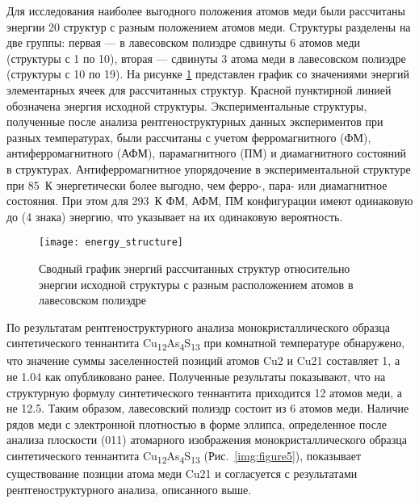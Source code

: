 Для исследования наиболее выгодного положения атомов меди были рассчитаны энергии 20 структур с разным положением атомов меди.
Структуры разделены на две группы: первая --- в лавесовском полиэдре сдвинуты 6 атомов меди (структуры с 1 по 10), вторая --- сдвинуты 3 атома меди в лавесовском полиэдре (структуры с 10 по 19).
На рисунке \ref{img:th} представлен график со значениями энергий элементарных ячеек для рассчитанных структур. Красной пунктирной линией обозначена энергия исходной структуры.
Экспериментальные структуры, полученные после анализа рентгеноструктурных данных  экспериментов при разных температурах, были рассчитаны с учетом ферромагнитного (ФМ), антиферромагнитного (АФМ), парамагнитного (ПМ) и диамагнитного состояний в структурах. 
Антиферромагнитное упорядочение в экспериментальной структуре при 85~К энергетически более выгодно, чем ферро-, пара- или диамагнитное состояния. При этом для 293~К ФМ, АФМ, ПМ конфигурации имеют одинаковую до (4 знака) энергию, что указывает на их одинаковую вероятность.

\begin{figure}[ht]
  \begin{minipage}[ht]{0.9\linewidth}\centering
    \texttt{[image: energy\_structure]}
  \end{minipage}

      \caption[Сводный график энергий рассчитанных структур относительно энергии исходной структуры с разным расположением атомов в лавесовском полиэдре]{Сводный график энергий рассчитанных структур относительно энергии исходной структуры с разным расположением атомов в лавесовском полиэдре}
    \label{img:th}
\end{figure}

По результатам рентгеноструктурного анализа монокристаллического образца синтетического теннантита Cu\textsubscript{12}As\textsubscript{4}S\textsubscript{13} при комнатной температуре обнаружено, что значение суммы заселенностей позиций атомов Cu2 и Cu21 составляет 1, а не 1.04 как опубликовано ранее\cite{Makovicky_2006}.
Полученные результаты показывают, что на структурную формулу синтетического теннантита приходится 12 атомов меди, а не 12.5.
Таким образом, лавесовский полиэдр состоит из 6 атомов меди.
Наличие рядов меди с электронной плотностью в форме эллипса, определенное после анализа плоскости (011) атомарного изображения монокристаллического образца синтетического теннантита Cu\textsubscript{12}As\textsubscript{4}S\textsubscript{13} (Рис.~\ref{img:figure5}), показывает существование позиции атома меди Cu21 и согласуется с результатами рентгеноструктурного анализа, описанного выше.

